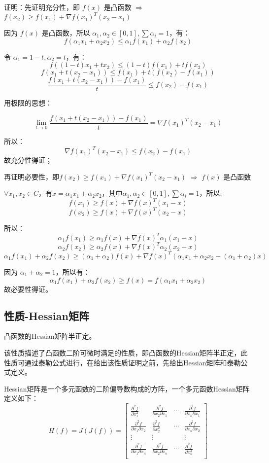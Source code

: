 \documentclass[12pt]{article}
\begin{document}
\begin{framed}  
\small{
证明：先证明充分性，即 $f(x)$ 是凸函数 $\Rightarrow$ $f(x_2) \ge f(x_1) + \nabla f(x_1)^T(x_2-x_1)$

因为 $f(x)$ 是凸函数，所以 $\alpha_1, \alpha_2 \in [0,1], \sum\alpha_i = 1$，有：
$$
f(\alpha_1x_1 + \alpha_2x_2) \le \alpha_1f(x_1) + \alpha_2f(x_2)
$$

令 $\alpha_1 = 1 - t, \alpha_2 = t$，有：
$$
f((1-t)x_1 + tx_2) \le (1-t)f(x_1) + tf(x_2)
$$
$$
f(x_1 + t(x_2-x_1)) \le f(x_1) + t(f(x_2) - f(x_1))
$$
$$
\frac{f(x_1 + t(x_2-x_1)) - f(x_1)}{t} \le f(x_2) - f(x_1)
$$

用极限的思想：

$$\lim_{t \to 0}\frac{f(x_1 + t(x_2-x_1)) - f(x_1)}{t} = \nabla f(x_1)^T(x_2 - x_1)$$

所以：
$$
\nabla f(x_1)^T(x_2 - x_1) \le f(x_2) - f(x_1)
$$
故充分性得证；

再证明必要性，即$f(x_2) \ge f(x_1) + \nabla f(x_1)^T(x_2-x_1)$ $\Rightarrow$  $f(x)$ 是凸函数

$\forall x_1, x_2 \in C$，有$x = \alpha_1x_1 + \alpha_2x_2$，其中$\alpha_1, \alpha_2 \in [0,1], \sum\alpha_i = 1$，所以:
$$
f(x_1) \ge f(x) + \nabla f(x)^T(x_1-x) 
$$
$$
f(x_2) \ge f(x) + \nabla f(x)^T(x_2-x) 
$$

所以：
$$
\alpha_1f(x_1) \ge \alpha_1f(x) + \nabla f(x)^T\alpha_1(x_1-x) 
$$
$$
\alpha_2f(x_2) \ge \alpha_2f(x) + \nabla f(x)^T\alpha_2(x_2-x) 
$$
$$
\alpha_1f(x_1) + \alpha_2f(x_2) \ge (\alpha_1+\alpha_2)f(x) + \nabla f(x)^T(\alpha_1x_1 + \alpha_2x_2 - (\alpha_1+\alpha_2)x)
$$

因为 $\alpha_1 + \alpha_2 = 1$，所以有：
$$
\alpha_1f(x_1) + \alpha_2f(x_2) \ge f(x) = f(\alpha_1x_1 + \alpha_2x_2)
$$
故必要性得证。
}
\end{framed}

\subsection{性质-Hessian矩阵}
凸函数的Hessian矩阵半正定。

该性质描述了凸函数二阶可微时满足的性质，即凸函数的Hessian矩阵半正定，此性质可通过泰勒公式进行，在给出该性质证明之前，先给出Hessian矩阵和泰勒公式定义。

Hessian矩阵是一个多元函数的二阶偏导数构成的方阵，一个多元函数Hessian矩阵定义如下：
$$
H(f) = J(J(f)) =
\begin{bmatrix}
\frac{\partial^2 f}{\partial x_1^2} & \frac{\partial^2 f}{\partial x_2\partial x_1} & \cdots & \frac{\partial^2 f}{\partial x_n\partial x_1}  \\
\frac{\partial^2 f}{\partial x_1\partial x_2} & \frac{\partial^2 f}{\partial x_2^2} & \cdots & \frac{\partial^2 f}{\partial x_n\partial x_2}  \\
\vdots & \vdots &  & \vdots \\
\frac{\partial^2 f}{\partial x_1\partial x_n} & \frac{\partial^2 f}{\partial x_2\partial x_n} & \cdots & \frac{\partial^2 f}{\partial x_n^2}  \\
\end{bmatrix}
$$
\end{document}
